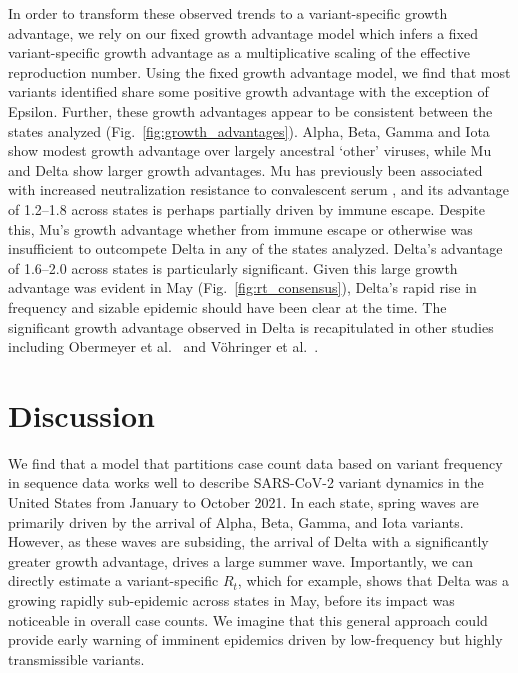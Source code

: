\documentclass[11pt,oneside,letterpaper]{article}
\begin{document}
In order to transform these observed trends to a variant-specific growth advantage, we rely on our fixed growth advantage model which infers a fixed variant-specific growth advantage as a multiplicative scaling of the effective reproduction number.
Using the fixed growth advantage model, we find that most variants identified share some positive growth advantage with the exception of Epsilon.
Further, these growth advantages appear to be consistent between the states analyzed (Fig.\ \ref{fig:growth_advantages}).
Alpha, Beta, Gamma and Iota show modest growth advantage over largely ancestral `other' viruses, while Mu and Delta show larger growth advantages.
Mu has previously been associated with increased neutralization resistance to convalescent serum \cite{Uriu2021}, and its advantage of 1.2--1.8 across states is perhaps partially driven by immune escape.
Despite this, Mu's growth advantage whether from immune escape or otherwise was insufficient to outcompete Delta in any of the states analyzed.
Delta's advantage of 1.6--2.0 across states is particularly significant.
Given this large growth advantage was evident in May (Fig.\ \ref{fig:rt_consensus}), Delta's rapid rise in frequency and sizable epidemic should have been clear at the time.
The significant growth advantage observed in Delta is recapitulated in other studies including Obermeyer et al.\ \cite{Obermeyer2021} and V\"ohringer et al.\ \cite{vohringer2021genomic}.


\section*{Discussion}


We find that a model that partitions case count data based on variant frequency in sequence data works well to describe SARS-CoV-2 variant dynamics in the United States from January to October 2021.
In each state, spring waves are primarily driven by the arrival of Alpha, Beta, Gamma, and Iota variants.
However, as these waves are subsiding, the arrival of Delta with a significantly greater growth advantage, drives a large summer wave.
Importantly, we can directly estimate a variant-specific $R_{t}$, which for example, shows that Delta was a growing rapidly sub-epidemic across states in May, before its impact was noticeable in overall case counts.
We imagine that this general approach could provide early warning of imminent epidemics driven by low-frequency but highly transmissible variants.
\end{document}
